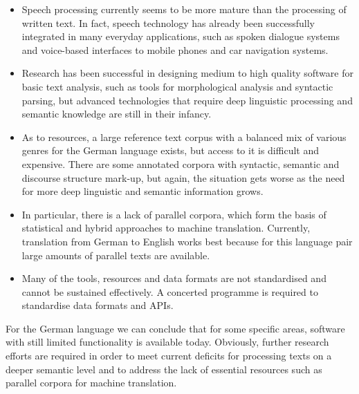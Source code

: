 \documentclass[]{../metanetpaper}
\begin{document}
\begin{itemize}
\item Speech processing currently seems to be more mature than the processing of written text. In fact, speech technology has already been successfully integrated in many everyday applications, such as spoken dialogue systems and voice-based interfaces to mobile phones and car navigation systems.  
\item Research has been successful in designing medium to high quality software for basic text analysis, such as tools for morphological analysis and syntactic parsing, but advanced technologies that require deep linguistic processing and semantic knowledge are still in their infancy. 
\item As to resources, a large reference text corpus with a balanced mix of various genres for the German language exists, but access to it is difficult and expensive. There are some annotated corpora with syntactic, semantic and discourse structure mark-up, but again, the situation gets worse as the need for more deep linguistic and semantic information grows. 
\item In particular, there is a lack of parallel corpora, which form the basis of statistical and hybrid approaches to machine translation. Currently, translation from German to English works best because for this language pair large amounts of parallel texts are available. 
\item Many of the tools, resources and data formats are not standardised and cannot be sustained effectively. A concerted programme is required to standardise data formats and APIs.
\end{itemize}
For the German language we can conclude that for some specific areas, software with still limited functionality is available today. Obviously, further research efforts are required in order to meet current deficits for processing texts on a deeper semantic level and to address the lack of essential resources such as parallel corpora for machine translation. 
\end{document}
